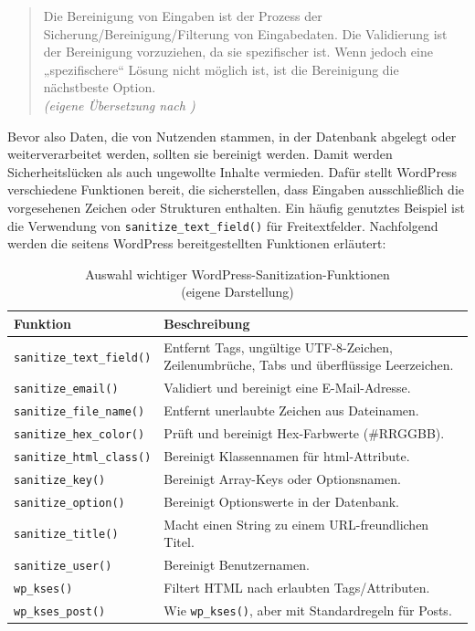 \begin{quote}
 Die Bereinigung von Eingaben ist der Prozess der Sicherung/Bereinigung/Filterung von Eingabedaten.
 Die Validierung ist der Bereinigung vorzuziehen, da sie spezifischer ist.
 Wenn jedoch eine „spezifischere“ Lösung nicht möglich ist, ist die Bereinigung die nächstbeste Option.
 \\[0.5em]
 \emph{(eigene Übersetzung nach \cite{wordpress2024plugin_sanitizing})}
\end{quote}


Bevor also Daten, die von Nutzenden stammen, in der Datenbank abgelegt oder weiterverarbeitet werden,
sollten sie bereinigt werden.
Damit werden Sicherheitslücken als auch ungewollte Inhalte vermieden.
Dafür stellt WordPress verschiedene Funktionen bereit, die sicherstellen, dass Eingaben ausschließlich
die vorgesehenen Zeichen oder Strukturen enthalten.
Ein häufig genutztes Beispiel ist die Verwendung von \texttt{sanitize\_text\_field()} für Freitextfelder.
Nachfolgend werden die seitens WordPress bereitgestellten Funktionen erläutert:

\begin{table}[h]
 \centering
 \begin{tabular}{|l|p{8cm}|}
  \hline
  \textbf{Funktion} & \textbf{Beschreibung} \\
  \hline
  \texttt{sanitize\_text\_field()} & Entfernt Tags, ungültige UTF-8-Zeichen, \newline Zeilenumbrüche, Tabs und überflüssige Leerzeichen. \\
  \hline
  \texttt{sanitize\_email()} & Validiert und bereinigt eine E-Mail-Adresse. \\
  \hline
  \texttt{sanitize\_file\_name()} & Entfernt unerlaubte Zeichen aus Dateinamen. \\
  \hline
  \texttt{sanitize\_hex\_color()} & Prüft und bereinigt Hex-Farbwerte (\#RRGGBB). \\
  \hline
  \texttt{sanitize\_html\_class()} & Bereinigt Klassennamen für \gls{html}-Attribute.                                                    \\
  \hline
  \texttt{sanitize\_key()} & Bereinigt Array-Keys oder Optionsnamen. \\
  \hline
  \texttt{sanitize\_option()} & Bereinigt Optionswerte in der Datenbank. \\
  \hline
  \texttt{sanitize\_title()} & Macht einen String zu einem URL-freundlichen Titel. \\
  \hline
  \texttt{sanitize\_user()} & Bereinigt Benutzernamen. \\
  \hline
  \texttt{wp\_kses()} & Filtert HTML nach erlaubten Tags/Attributen. \\
  \hline
  \texttt{wp\_kses\_post()} & Wie \texttt{wp\_kses()}, aber mit Standardregeln für Posts. \\
  \hline
 \end{tabular}
 \caption{Auswahl wichtiger WordPress-Sanitization-Funktionen \\(eigene Darstellung)}
\end{table}

